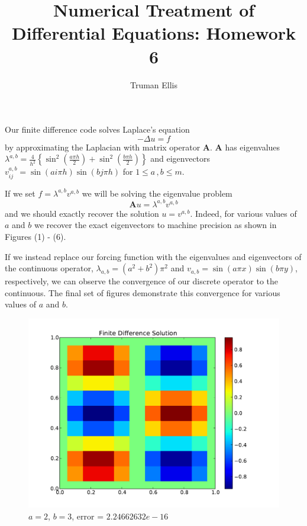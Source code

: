 \documentclass[10pt,letterpaper]{article}
\title{Numerical Treatment of Differential Equations: Homework 6}
\author{Truman Ellis}
\def\mbf{\mathbf}
\begin{document}
\maketitle

Our finite difference code solves Laplace's equation
\[
-\Delta u = f
\]
by approximating the Laplacian with matrix operator $\mbf{A}$. $\mbf{A}$ has
eigenvalues $\lambda^{a,b}=\frac{4}{h^2}\left\{\sin^2\left(\frac{a\pi
h}{2}\right)+\sin^2\left(\frac{b\pi h}{2}\right)\right\}$ and eigenvectors 
$v^{a,b}_{ij}=\sin(ai\pi h)\sin(bj\pi h)$ for $1\le a\,,b\le m$.

If we set $f=\lambda^{a,b}v^{a,b}$ we will be solving the eigenvalue problem
\[
\mbf{A}u=\lambda^{a,b}v^{a,b}
\]
and we should exactly recover the solution $u=v^{a,b}$. Indeed, for various
values of $a$ and $b$ we recover the exact eigenvectors to machine precision as
shown in Figures (1) - (6).

If we instead replace our forcing function with the eigenvalues and eigenvectors
of the continuous operator, $\lambda_{a,b}=(a^2+b^2)\pi^2$ and $v_{a,b}=\sin(a\pi
x)\sin(b\pi y)$, respectively, we can observe the
convergence of our discrete operator to the continuous. The final set of figures
demonstrate this convergence for various values of $a$ and $b$.

\begin{figure}[p]
\begin{center}
\includegraphics[width=5in,keepaspectratio]{a23.pdf}
\end{center}
\caption{$a=2$, $b=3$, error = $2.24662632e-16$}
\end{figure}
\end{document}
